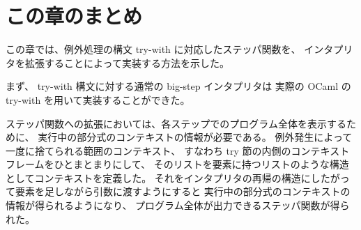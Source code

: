 \section{この章のまとめ}
\label{section:try-with__conclusion}

この章では、例外処理の構文 try-with に対応したステッパ関数を、
インタプリタを拡張することによって実装する方法を示した。

まず、 try-with 構文に対する通常の big-step インタプリタは
実際の OCaml の try-with を用いて実装することができた。

ステッパ関数への拡張においては、各ステップでのプログラム全体を表示するために、
実行中の部分式のコンテキストの情報が必要である。
例外発生によって一度に捨てられる範囲のコンテキスト、
すなわち try 節の内側のコンテキストフレームをひとまとまりにして、
そのリストを要素に持つリストのような構造としてコンテキストを定義した。
それをインタプリタの再帰の構造にしたがって要素を足しながら引数に渡すようにすると
実行中の部分式のコンテキストの情報が得られるようになり、
プログラム全体が出力できるステッパ関数が得られた。
